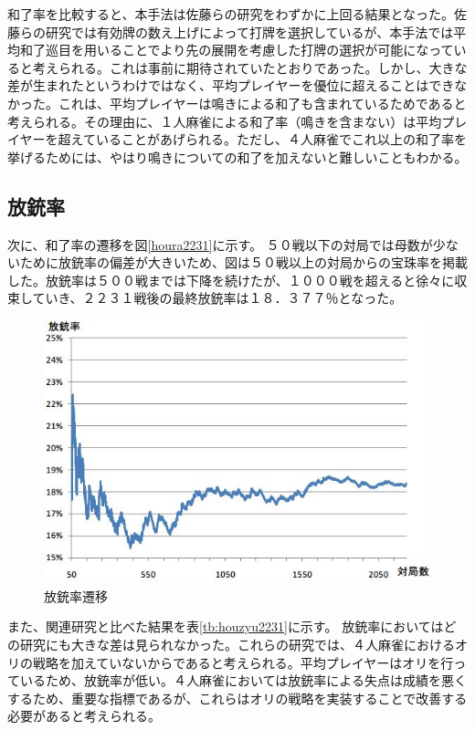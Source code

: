 和了率を比較すると、本手法は佐藤らの研究をわずかに上回る結果となった。佐藤らの研究では有効牌の数え上げによって打牌を選択しているが、本手法では平均和了巡目を用いることでより先の展開を考慮した打牌の選択が可能になっていると考えられる。これは事前に期待されていたとおりであった。しかし、大きな差が生まれたというわけではなく、平均プレイヤーを優位に超えることはできなかった。これは、平均プレイヤーは鳴きによる和了も含まれているためであると考えられる。その理由に、１人麻雀による和了率（鳴きを含まない）は平均プレイヤーを超えていることがあげられる。ただし、４人麻雀でこれ以上の和了率を挙げるためには、やはり鳴きについての和了を加えないと難しいこともわかる。


\subsection{放銃率}
次に、和了率の遷移を図\ref{houra2231}に示す。
５０戦以下の対局では母数が少ないために放銃率の偏差が大きいため、図は５０戦以上の対局からの宝珠率を掲載した。放銃率は５００戦までは下降を続けたが、１０００戦を超えると徐々に収束していき、２２３１戦後の最終放銃率は１８．３７７％となった。
\begin{figure}[h]
 \centering
 \includegraphics[keepaspectratio, scale=0.8,bb=0 0 544 370]
      {img/houzyu2231.jpg}
 \caption{放銃率遷移}
 \label{houzyu2231}
\end{figure}

また、関連研究と比べた結果を表\ref{tb:houzyu2231}に示す。
放銃率においてはどの研究にも大きな差は見られなかった。これらの研究では、４人麻雀におけるオリの戦略を加えていないからであると考えられる。平均プレイヤーはオリを行っているため、放銃率が低い。４人麻雀においては放銃率による失点は成績を悪くするため、重要な指標であるが、これらはオリの戦略を実装することで改善する必要があると考えられる。

